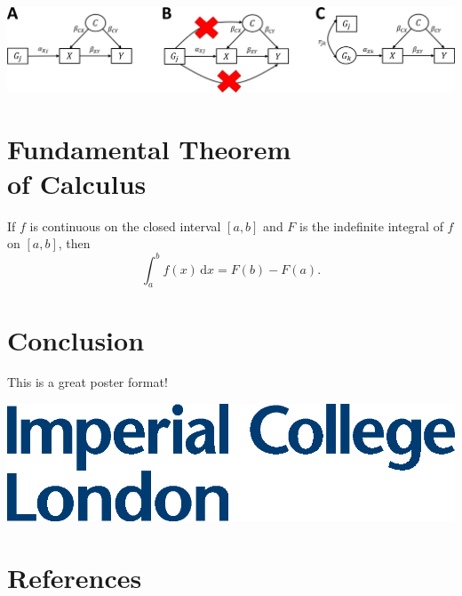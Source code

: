 \documentclass[a0paper,fleqn]{betterposter}
\begin{document}
{%
    \includegraphics[width=\textwidth]{mr.png} %
    \cite{de2022understanding}


\section{Fundamental Theorem\\of Calculus}
If $f$ is continuous on the closed interval $[a,b]$ and $F$ is the indefinite integral of $f$ on $[a,b]$, then
\begin{equation}
\int_a^b f(x)\,\mathrm{d}x = F(b)-F(a).
\end{equation}

\section{Conclusion}
This is a great poster format!



\vfill

\includegraphics[width=\textwidth]{img/logo}\\

}{

\section{References}
\printbibliography[heading=none]


}
\end{document}
